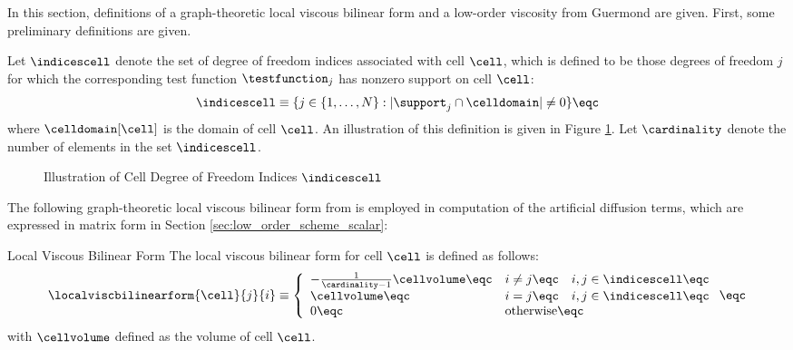In this section, definitions of a graph-theoretic local viscous bilinear form
and a low-order viscosity from Guermond \cite{guermond_firstorder} are given.
First, some preliminary definitions are given.

Let $\indicescell$ denote the set of degree of freedom indices associated with
cell $\cell$, which is defined to be those degrees of freedom $j$ for which the
corresponding test function $\testfunction_j$ has nonzero support on cell
$\cell$:
\begin{equation}
  \indicescell \equiv \{j\in\{1,\ldots,N\}: |\support_j\cap \celldomain|\ne 0\}
  \eqc
\end{equation}
where $\celldomain[\cell]$ is the domain of cell $\cell$. An illustration of
this definition is given in Figure \ref{fig:cell_indices}.
Let $\cardinality$ denote the number of elements in the set $\indicescell$.
\begin{figure}[ht]
   \centering
     
      \caption{Illustration of Cell Degree of Freedom Indices $\indicescell$}
   \label{fig:cell_indices}
\end{figure}
The following graph-theoretic local viscous bilinear form from
\cite{guermond_firstorder} is employed in computation of the artificial
diffusion terms, which are expressed in matrix form in Section
\ref{sec:low_order_scheme_scalar}:
\begin{definition}{Local Viscous Bilinear Form}
   The local viscous bilinear form for cell $\cell$ is defined as follows:
   \begin{equation}\label{eq:bilinearform}
     \localviscbilinearform{\cell}{j}{i} \equiv \left\{\begin{array}{l l}
       -\frac{1}{\cardinality - 1}\cellvolume\eqc & i\ne j\eqc
       \quad i,j\in \indicescell\eqc \\
       \cellvolume\eqc & i = j \eqc \quad i,j\in \indicescell\eqc \\
       0          \eqc & \mbox{otherwise}\eqc
     \end{array}\right. \eqc
   \end{equation}
   with $\cellvolume$ defined as the volume of cell $\cell$.
\end{definition}
